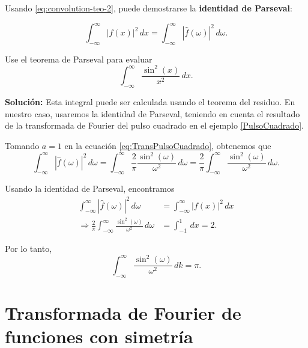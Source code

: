 Usando \eqref{eq:convolution-teo-2}, puede demostrarse la  \textbf{identidad de Parseval}:
\begin{shaded}
\begin{equation}
        \int_{-\infty}^{\infty} |f(x)|^2 \,dx =  \int_{-\infty}^{\infty} |\hat{f}(\omega)|^2 \,d\omega.
    \end{equation}    
\end{shaded}

\begin{ejemplo}
    Use el teorema de Parseval para evaluar
    \begin{equation}
      \int_{-\infty}^{\infty}  \frac{\sin^2(x)}{x^2} \,dx.
    \end{equation}

    \textbf{Solución:} Esta integral puede ser calculada usando el teorema del residuo. En nuestro caso, usaremos la identidad de Parseval, teniendo en cuenta el resultado de la transformada de Fourier del pulso cuadrado en el ejemplo \ref{PulsoCuadrado}. 

    Tomando $a = 1$ en la ecuación \eqref{eq:TransPulsoCuadrado}, obtenemos que
    \begin{equation}
     \int_{- \infty}^{\infty} |\hat{f}(\omega)|^2 \,d\omega = \int_{- \infty}^{\infty} \frac{2}{\pi}\frac{\sin^2(\omega)}{\omega^2}  \,d\omega = \frac{2}{\pi} \int_{-\infty}^{\infty}  \frac{\sin^2(\omega)}{\omega^2} \,d\omega.   
    \end{equation}

    Usando la identidad de Parseval, encontramos
    \begin{align}
        \int_{- \infty}^{\infty} |\hat{f}(\omega)|^2 \,d\omega &= \int_{-\infty}^{\infty} |f(x)|^2 \,dx \\
        \Rightarrow \frac{2}{\pi} \int_{-\infty}^{\infty}  \frac{\sin^2(\omega)}{\omega^2} \,d\omega &=  \int_{-1}^1  \,dx = 2. 
    \end{align}

Por lo tanto,
\begin{equation}
\int_{-\infty}^{\infty}  \frac{\sin^2(\omega)}{\omega^2} \,dk = \pi. 
\end{equation}

\end{ejemplo}


\section{Transformada de Fourier de funciones con simetría}

